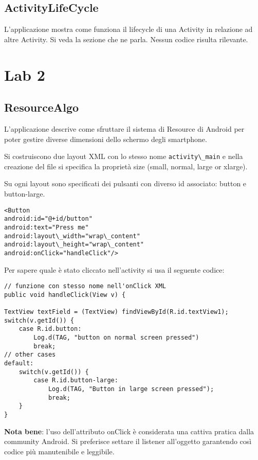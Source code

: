 \subsection{ActivityLifeCycle}
L'applicazione mostra come funziona il lifecycle di una Activity in relazione ad altre Activity. Si veda la sezione che ne parla. Nessun codice risulta rilevante.


\section{Lab 2}

\subsection{ResourceAlgo}
L'applicazione descrive come sfruttare il sistema di Resource di Android per poter gestire diverse dimensioni dello schermo degli smartphone.

Si costruiscono due layout XML con lo stesso nome \lstinline|activity\_main| e nella creazione del file si specifica la proprietà size (small, normal, large or xlarge).

Su ogni layout sono specificati dei pulsanti con diverso id associato: button e button-large.
\begin{lstlisting}
<Button
android:id="@+id/button"
android:text="Press me"
android:layout\_width="wrap\_content"
android:layout\_height="wrap\_content"
android:onClick="handleClick"/>
\end{lstlisting}

Per sapere quale è stato cliccato nell'activity si usa il seguente codice:
\begin{lstlisting}
// funzione con stesso nome nell'onClick XML
public void handleClick(View v) {

TextView textField = (TextView) findViewById(R.id.textView1);
switch(v.getId()) {
	case R.id.button: 
		Log.d(TAG, "button on normal screen pressed")
		break;
// other cases
default: 
	switch(v.getId()) {
		case R.id.button-large: 
			Log.d(TAG, "Button in large screen pressed");
			break;
	}
}
\end{lstlisting}

\textbf{Nota bene}: l'uso dell'attributo onClick è considerata una cattiva pratica dalla community Android. Si preferisce settare il listener all'oggetto garantendo così codice più manutenibile e leggibile.

